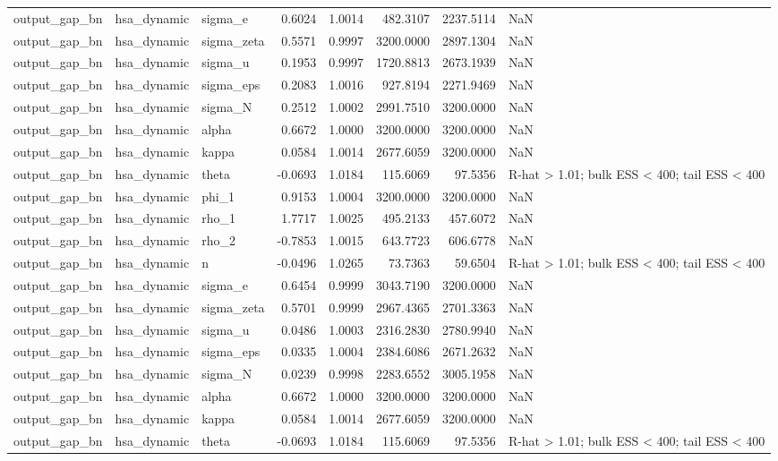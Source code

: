 \begin{tabular}{lllrrrrl}
output\_gap\_bn & hsa\_dynamic & sigma\_e & 0.6024 & 1.0014 & 482.3107 & 2237.5114 & NaN \\
output\_gap\_bn & hsa\_dynamic & sigma\_zeta & 0.5571 & 0.9997 & 3200.0000 & 2897.1304 & NaN \\
output\_gap\_bn & hsa\_dynamic & sigma\_u & 0.1953 & 0.9997 & 1720.8813 & 2673.1939 & NaN \\
output\_gap\_bn & hsa\_dynamic & sigma\_eps & 0.2083 & 1.0016 & 927.8194 & 2271.9469 & NaN \\
output\_gap\_bn & hsa\_dynamic & sigma\_N & 0.2512 & 1.0002 & 2991.7510 & 3200.0000 & NaN \\
output\_gap\_bn & hsa\_dynamic & alpha & 0.6672 & 1.0000 & 3200.0000 & 3200.0000 & NaN \\
output\_gap\_bn & hsa\_dynamic & kappa & 0.0584 & 1.0014 & 2677.6059 & 3200.0000 & NaN \\
output\_gap\_bn & hsa\_dynamic & theta & -0.0693 & 1.0184 & 115.6069 & 97.5356 & R-hat > 1.01; bulk ESS < 400; tail ESS < 400 \\
output\_gap\_bn & hsa\_dynamic & phi\_1 & 0.9153 & 1.0004 & 3200.0000 & 3200.0000 & NaN \\
output\_gap\_bn & hsa\_dynamic & rho\_1 & 1.7717 & 1.0025 & 495.2133 & 457.6072 & NaN \\
output\_gap\_bn & hsa\_dynamic & rho\_2 & -0.7853 & 1.0015 & 643.7723 & 606.6778 & NaN \\
output\_gap\_bn & hsa\_dynamic & n & -0.0496 & 1.0265 & 73.7363 & 59.6504 & R-hat > 1.01; bulk ESS < 400; tail ESS < 400 \\
output\_gap\_bn & hsa\_dynamic & sigma\_e & 0.6454 & 0.9999 & 3043.7190 & 3200.0000 & NaN \\
output\_gap\_bn & hsa\_dynamic & sigma\_zeta & 0.5701 & 0.9999 & 2967.4365 & 2701.3363 & NaN \\
output\_gap\_bn & hsa\_dynamic & sigma\_u & 0.0486 & 1.0003 & 2316.2830 & 2780.9940 & NaN \\
output\_gap\_bn & hsa\_dynamic & sigma\_eps & 0.0335 & 1.0004 & 2384.6086 & 2671.2632 & NaN \\
output\_gap\_bn & hsa\_dynamic & sigma\_N & 0.0239 & 0.9998 & 2283.6552 & 3005.1958 & NaN \\
output\_gap\_bn & hsa\_dynamic & alpha & 0.6672 & 1.0000 & 3200.0000 & 3200.0000 & NaN \\
output\_gap\_bn & hsa\_dynamic & kappa & 0.0584 & 1.0014 & 2677.6059 & 3200.0000 & NaN \\
output\_gap\_bn & hsa\_dynamic & theta & -0.0693 & 1.0184 & 115.6069 & 97.5356 & R-hat > 1.01; bulk ESS < 400; tail ESS < 400 \\

\end{tabular}
